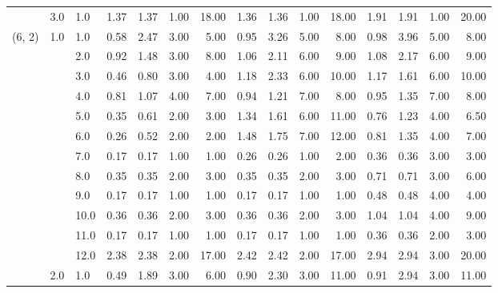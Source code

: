 \begin{tabular}{lllrrrrrrrrrrrr}
       & 3.0 & 1.0  &       1.37 &      1.37 & 1.00 &  18.00 &       1.36 &      1.36 &  1.00 &  18.00 &       1.91 &      1.91 &  1.00 &  20.00 \\
(6, 2) & 1.0 & 1.0  &       0.58 &      2.47 & 3.00 &   5.00 &       0.95 &      3.26 &  5.00 &   8.00 &       0.98 &      3.96 &  5.00 &   8.00 \\
       &     & 2.0  &       0.92 &      1.48 & 3.00 &   8.00 &       1.06 &      2.11 &  6.00 &   9.00 &       1.08 &      2.17 &  6.00 &   9.00 \\
       &     & 3.0  &       0.46 &      0.80 & 3.00 &   4.00 &       1.18 &      2.33 &  6.00 &  10.00 &       1.17 &      1.61 &  6.00 &  10.00 \\
       &     & 4.0  &       0.81 &      1.07 & 4.00 &   7.00 &       0.94 &      1.21 &  7.00 &   8.00 &       0.95 &      1.35 &  7.00 &   8.00 \\
       &     & 5.0  &       0.35 &      0.61 & 2.00 &   3.00 &       1.34 &      1.61 &  6.00 &  11.00 &       0.76 &      1.23 &  4.00 &   6.50 \\
       &     & 6.0  &       0.26 &      0.52 & 2.00 &   2.00 &       1.48 &      1.75 &  7.00 &  12.00 &       0.81 &      1.35 &  4.00 &   7.00 \\
       &     & 7.0  &       0.17 &      0.17 & 1.00 &   1.00 &       0.26 &      0.26 &  1.00 &   2.00 &       0.36 &      0.36 &  3.00 &   3.00 \\
       &     & 8.0  &       0.35 &      0.35 & 2.00 &   3.00 &       0.35 &      0.35 &  2.00 &   3.00 &       0.71 &      0.71 &  3.00 &   6.00 \\
       &     & 9.0  &       0.17 &      0.17 & 1.00 &   1.00 &       0.17 &      0.17 &  1.00 &   1.00 &       0.48 &      0.48 &  4.00 &   4.00 \\
       &     & 10.0 &       0.36 &      0.36 & 2.00 &   3.00 &       0.36 &      0.36 &  2.00 &   3.00 &       1.04 &      1.04 &  4.00 &   9.00 \\
       &     & 11.0 &       0.17 &      0.17 & 1.00 &   1.00 &       0.17 &      0.17 &  1.00 &   1.00 &       0.36 &      0.36 &  2.00 &   3.00 \\
       &     & 12.0 &       2.38 &      2.38 & 2.00 &  17.00 &       2.42 &      2.42 &  2.00 &  17.00 &       2.94 &      2.94 &  3.00 &  20.00 \\
       & 2.0 & 1.0  &       0.49 &      1.89 & 3.00 &   6.00 &       0.90 &      2.30 &  3.00 &  11.00 &       0.91 &      2.94 &  3.00 &  11.00 \\

\end{tabular}
